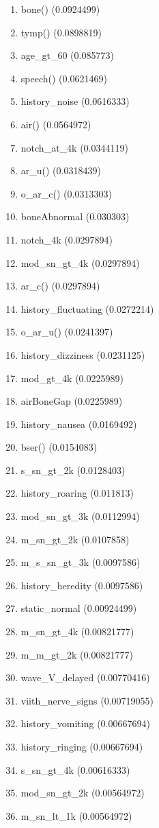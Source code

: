 \begin{enumerate}
\item bone() (0.0924499)
\item tymp() (0.0898819)
\item age\_gt\_60 (0.085773)
\item speech() (0.0621469)
\item history\_noise (0.0616333)
\item air() (0.0564972)
\item notch\_at\_4k (0.0344119)
\item ar\_u() (0.0318439)
\item o\_ar\_c() (0.0313303)
\item boneAbnormal (0.030303)
\item notch\_4k (0.0297894)
\item mod\_sn\_gt\_4k (0.0297894)
\item ar\_c() (0.0297894)
\item history\_fluctuating (0.0272214)
\item o\_ar\_u() (0.0241397)
\item history\_dizziness (0.0231125)
\item mod\_gt\_4k (0.0225989)
\item airBoneGap (0.0225989)
\item history\_nausea (0.0169492)
\item bser() (0.0154083)
\item s\_sn\_gt\_2k (0.0128403)
\item history\_roaring (0.011813)
\item mod\_sn\_gt\_3k (0.0112994)
\item m\_sn\_gt\_2k (0.0107858)
\item m\_s\_sn\_gt\_3k (0.0097586)
\item history\_heredity (0.0097586)
\item static\_normal (0.00924499)
\item m\_sn\_gt\_4k (0.00821777)
\item m\_m\_gt\_2k (0.00821777)
\item wave\_V\_delayed (0.00770416)
\item viith\_nerve\_signs (0.00719055)
\item history\_vomiting (0.00667694)
\item history\_ringing (0.00667694)
\item s\_sn\_gt\_4k (0.00616333)
\item mod\_sn\_gt\_2k (0.00564972)
\item m\_sn\_lt\_1k (0.00564972)

\end{enumerate}
